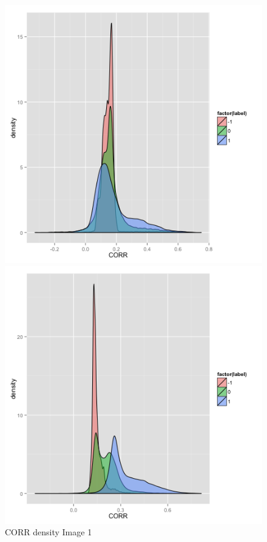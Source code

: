 \documentclass{article}\usepackage[]{graphicx}\usepackage[]{color}
\begin{document}
\begin{figure}[h]
  \includegraphics[width=\linewidth]{CORR1.png}
  \caption{CORR density Image 1}\label{}
\endminipage\hfill
{}
  \includegraphics[width=\linewidth]{CORR2.png}

\end{figure}
\end{document}
